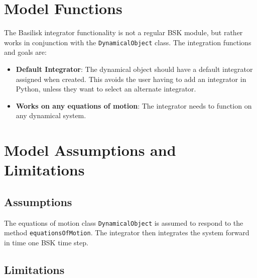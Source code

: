 
\section{Model Functions}

The Basilisk integrator functionality is not a regular BSK module, but rather works in conjunction with the {\tt DynamicalObject} class.    The integration functions and goals are:


\begin{itemize}
	\item \textbf{Default Integrator}: The dynamical object should have a default integrator assigned when created.  This avoids the user having to add an integrator in Python, unless they want to select an alternate integrator.
	\item \textbf{Works on any equations of motion}: The integrator needs to function on any dynamical system.
\end{itemize}



\section{Model Assumptions and Limitations}

\subsection{Assumptions}

The equations of motion class {\tt DynamicalObject} is assumed to respond to the method  {\tt equationsOfMotion}.  The integrator then integrates the system forward in time one BSK time step.  

\subsection{Limitations}

